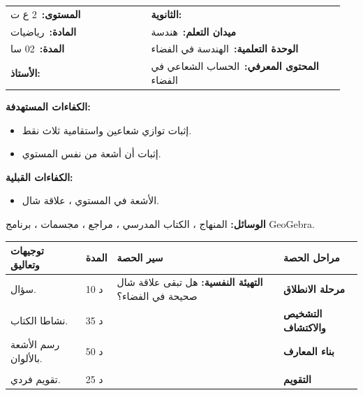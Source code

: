 \documentclass[12pt,a4paper]{article}
\makeatletter
\newenvironment{LTR}{\begin{otherlanguage}{english}}{\end{otherlanguage}}
\newcommand{\ar}[1]{\foreignlanguage{arabic}{#1}}
\newcommand{\Phase}[1]{\textbf{#1}}
\newcommand{\Fld}[2]{\textbf{#1:}\ #2}
\newcommand{\ModhHead}[9]{%
\begin{LTR}
\begin{tcolorbox}[enhanced,colback=white,colframe=cThm!85!black,arc=4mm,boxrule=1pt,top=14pt,bottom=6pt,left=8pt,right=8pt,
 overlay={\node[fill=cThm!85!black,text=white,rounded corners=3mm,inner xsep=14pt,inner ysep=4pt,font=\large\bfseries] at ([yshift=0pt]frame.north){\ar{مذكرة رقم #1}};},
 before upper={\selectlanguage{arabic}}]
\begin{tabular}{@{}p{0.4\linewidth}p{0.55\linewidth}@{}}
\Fld{المستوى}{#2} & \Fld{الثانوية}{\dotfill}\\[3pt]
\Fld{المادة}{رياضيات} & \Fld{ميدان التعلم}{#3}\\[3pt]
\Fld{المدة}{#5} & \Fld{الوحدة التعلمية}{#4}\\[3pt]
\Fld{الأستاذ}{\dotfill} & \Fld{المحتوى المعرفي}{#6}\\
\end{tabular}
\end{tcolorbox}
\begin{tcolorbox}[enhanced,colback=white,colframe=cThm!85!black,arc=3mm,boxrule=0.8pt,sidebyside,sidebyside align=top,lefthand ratio=0.5,
 segmentation style={dashed,cThm!60},before upper={\selectlanguage{arabic}},before lower={\selectlanguage{arabic}}]
\textbf{الكفاءات المستهدفة:}\par #8
\tcblower
\textbf{الكفاءات القبلية:}\par #7
\end{tcolorbox}
\end{LTR}
\par\smallskip\textbf{الوسائل:} #9\par\smallskip}
\newenvironment{Sayr}{%
\begin{LTR}\renewcommand{\arraystretch}{1.25}
\begin{longtable}{|p{0.17\textwidth}|>{\centering\arraybackslash}p{0.06\textwidth}|p{0.53\textwidth}|>{\centering\arraybackslash}p{0.12\textwidth}|}
\hline\rowcolor{cThm!12}\ar{\textbf{توجيهات وتعاليق}} & \ar{\textbf{المدة}} & \ar{\textbf{سير الحصة}} & \ar{\textbf{مراحل الحصة}}\\\hline\endhead
\hline\endfoot}{\end{longtable}\end{LTR}}
\newcommand{\Row}[4]{\ar{\small #4} & \ar{#3} & \ar{#2} & \cellcolor{cThm!8}\ar{\Phase{#1}}\\\hline}
\newcommand{\Lab}[2]{\foreignlanguage{english}{\tcbox[on line,colback=#1,colframe=#1,boxrule=0pt,arc=2pt,boxsep=1pt,left=5pt,right=5pt,top=1pt,bottom=1pt]{\ar{\textcolor{white}{\textbf{#2}}}}}}
\newcommand{\ck}{\ensuremath{{\color{cRem}\checkmark}}}
\makeatother
\begin{document}
\newpage
\ModhHead{68}{2 ع ت}{هندسة}{الهندسة في الفضاء}{02 سا}{الحساب الشعاعي في الفضاء}%
{\begin{itemize}\item الأشعة في المستوي ، علاقة شال.\end{itemize}}%
{\begin{itemize}\item إثبات توازي شعاعين واستقامية ثلاث نقط.\item إثبات أن أشعة من نفس المستوي.\end{itemize}}%
{المنهاج ، الكتاب المدرسي ، مراجع ، مجسمات ، برنامج GeoGebra.}
\begin{Sayr}
\Row{مرحلة الانطلاق}{%
\textbf{التهيئة النفسية:} هل تبقى علاقة شال صحيحة في الفضاء؟}{10 د}{سؤال.}
\Row{التشخيص والاكتشاف}{%
\Lab{cEx}{مناقشة النشاطين 03 و 05 صفحة 271}\par\ck\ نعبر عن شعاع بدلالة شعاعين آخرين بعلاقة شال.\par
\ck\ نستنتج توازي مستقيمين أو انتماء أشعة إلى نفس المستوي.\par
}{35 د}{نشاطا الكتاب.}
\Row{بناء المعارف}{%
\Lab{cThm}{خاصية}\par\ck\ قواعد الحساب الشعاعي في المستوي تبقى صحيحة في الفضاء.\par
\ck\ $\overrightarrow{AB}$ و $\overrightarrow{AC}$ مرتبطان خطياً إذا وفقط إذا كانت $A$ ، $B$ ، $C$ على استقامة واحدة.\par
\Lab{cDef}{أشعة من نفس المستوي}\ $\vec w$ و $\vec u$ و $\vec v$ ($\vec u$ ، $\vec v$ غير مرتبطين خطياً) من نفس المستوي إذا وُجد $a$ و $b$ حيث $\vec w=a\vec u+b\vec v$.\par}{50 د}{رسم الأشعة بالألوان.}
\Row{}{%
\Lab{cEx}{مثال}\ $ABCD$ رباعي وجوه ، $I$ و $J$ منتصفا $[AB]$ و $[CD]$: $\overrightarrow{IJ}=\overrightarrow{IA}+\overrightarrow{AD}+\overrightarrow{DJ}$ و $\overrightarrow{IJ}=\overrightarrow{IB}+\overrightarrow{BC}+\overrightarrow{CJ}$ ؛ بالجمع: $\overrightarrow{IJ}=\frac12(\overrightarrow{AD}+\overrightarrow{BC})$ ، إذن الأشعة $\overrightarrow{IJ}$ ، $\overrightarrow{AD}$ ، $\overrightarrow{BC}$ من نفس المستوي.\par\Lab{cThm!80!black}{حذار}\ أشعة من نفس المستوي لا تعني أن النقط من نفس المستوي.}{}{}
\Row{التقويم}{%
\Lab{cEx}{تطبيق}\par في المكعب $ABCDEFGH$: بيّن أن $\overrightarrow{AG}=\overrightarrow{AB}+\overrightarrow{AD}+\overrightarrow{AE}$.\par\textbf{الحل:} $\overrightarrow{AG}=\overrightarrow{AC}+\overrightarrow{CG}=(\overrightarrow{AB}+\overrightarrow{AD})+\overrightarrow{AE}$.\par\textbf{واجب منزلي:} تمارين من باب الأشعة في الفضاء.\par\smallskip\textbf{ملاحظات حول سير الحصة:} \dotfill}{25 د}{تقويم فردي.}
\end{Sayr}
\end{document}

